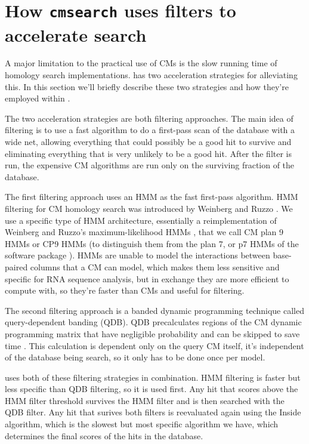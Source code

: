 \section{How \texttt{cmsearch} uses filters to accelerate search}

A major limitation to the practical use of CMs is the slow running
time of homology search implementations.  has two
acceleration strategies for alleviating this. In this section we'll
briefly describe these two strategies and how they're employed within
.

The two acceleration strategies are both filtering approaches.  The
main idea of filtering is to use a fast algorithm to do a first-pass
scan of the database with a wide net, allowing everything that
could possibly be a good hit to survive and eliminating everything
that is very unlikely to be a good hit. After the filter is run, the
expensive CM algorithms are run only on the surviving fraction of the
database.

The first filtering approach uses an HMM as the fast first-pass
algorithm. HMM filtering for CM homology search was introduced by
Weinberg and Ruzzo
\cite{WeinbergRuzzo04,WeinbergRuzzo04b,WeinbergRuzzo06}. We use a
specific type of HMM architecture, essentially a reimplementation of
Weinberg and Ruzzo's maximum-likelihood HMMs \cite{WeinbergRuzzo06},
that we call CM plan 9 HMMs or CP9 HMMs (to distinguish them from the
plan 7, or p7 HMMs of the  software package
). HMMs
are unable to model the interactions between base-paired columns that
a CM can model, which makes them less sensitive and specific for RNA
sequence analysis, but in exchange they are more efficient to compute
with, so they're faster than CMs and useful for filtering.

The second filtering approach is a banded dynamic programming
technique called query-dependent banding (QDB). QDB precalculates
regions of the CM dynamic programming matrix that have negligible
probability and can be skipped to save time
\cite{NawrockiEddy07}. This calculation is dependent only on the query
CM itself, it's independent of the database being search, so it only
has to be done once per model. 

 uses both of these filtering strategies in
combination. HMM filtering is faster but less specific than QDB
filtering, so it is used first. Any hit that scores above the HMM
filter threshold survives the HMM filter and is then searched with the
QDB filter. Any hit that surives both filters is reevaluated again
using the Inside algorithm, which is the slowest but most specific
algorithm we have, which determines the final scores of the hits in
the database.

